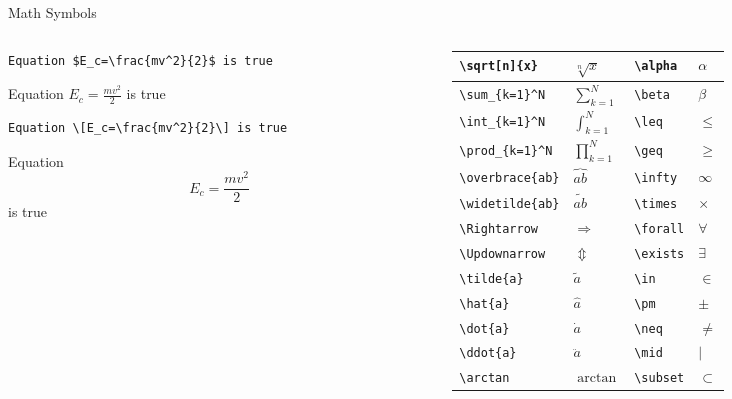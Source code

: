 \begin{frame}[fragile]{Math Symbols}
\begin{columns}
\begin{column}{4.5cm}
\begin{lstlisting}
Equation $E_c=\frac{mv^2}{2}$ is true
\end{lstlisting}

\begin{block}{}
Equation $E_c=\frac{mv^2}{2}$ is true
\end{block}
\vspace{0.5cm}
\begin{lstlisting}
Equation \[E_c=\frac{mv^2}{2}\] is true
\end{lstlisting}

\begin{block}{}
Equation \[E_c=\frac{mv^2}{2}\] is true
\end{block}
\end{column}
\begin{column}{5.5cm}
\begin{center}
\scriptsize
\begin{tabular}{| l l | l l|}
\hline
\verb!\sqrt[n]{x}! & $\sqrt[n]{x}$ & \verb!\alpha! & $\alpha$
\\
\hline
\verb!\sum_{k=1}^N! & $\sum_{k=1}^N$ & \verb!\beta! & $\beta$
\\
\hline
\verb!\int_{k=1}^N! & $\int_{k=1}^N$ & \verb!\leq! & $\leq$
\\
\hline
\verb!\prod_{k=1}^N! & $\prod_{k=1}^N$ & \verb!\geq! & $\geq$
\\
\hline
\verb!\overbrace{ab}! & $\overbrace{ab}$ & \verb!\infty! & $\infty$
\\
\hline
\verb!\widetilde{ab}! & $\widetilde{ab}$ & \verb!\times! & $\times$
\\
\hline
\verb!\Rightarrow! & $\Rightarrow$ & \verb!\forall! & $\forall$
\\
\hline
\verb!\Updownarrow! & $\Updownarrow$ & \verb!\exists! & $\exists$
\\
\hline
\verb!\tilde{a}! & $\tilde{a}$ & \verb!\in! & $\in$
\\
\hline
\verb!\hat{a}! & $\hat{a}$ & \verb!\pm! & $\pm$
\\
\hline
\verb!\dot{a}! & $\dot{a}$ & \verb!\neq! & $\neq$ \\
\hline
\verb!\ddot{a}! & $\ddot{a}$ & \verb!\mid! & $\mid$
\\
\hline
\verb!\arctan! & $\arctan$ & \verb!\subset! & $\subset$
\\

\end{tabular}
\end{center}
\end{column}
\end{columns}
\end{frame}
